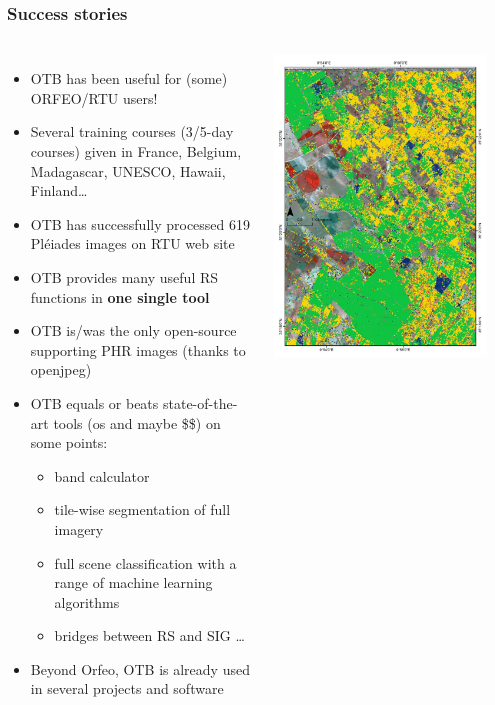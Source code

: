 \documentclass[8pt]{beamer}
\begin{document}
\begin{frame}
\frametitle{Success stories}
\begin{columns}
\begin{itemize}
\item OTB has been useful for (some) ORFEO/RTU users!
\item Several training courses (3/5-day courses) given in France, Belgium,
Madagascar, UNESCO, Hawaii, \alert{Finland}\ldots
\item OTB has successfully processed 619 Pléiades
  images on RTU web site
\item OTB provides many useful RS functions in \textbf{one single tool}
\item OTB is/was the only open-source supporting PHR images (thanks to openjpeg)
\item OTB equals or beats state-of-the-art tools (os and maybe \$\$) on some points: 
  \begin{itemize}
  \item band calculator
  \item tile-wise segmentation of full imagery
  \item full scene classification with a range of machine learning algorithms
  \item bridges between RS and SIG \ldots
  \end{itemize}
\item Beyond Orfeo, OTB is already used in several projects and software
\end{itemize}
\includegraphics[width=0.9\textwidth]{images/resultats_ird.png}\\

\end{columns}
\end{frame}
\end{document}
